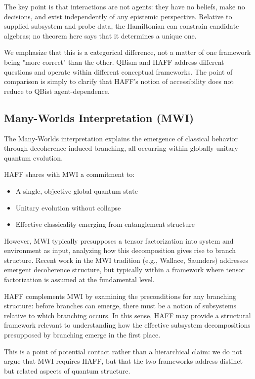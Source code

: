 \documentclass[12pt,a4paper,openany]{book}
\begin{document}
The key point is that interactions are not agents: they have no beliefs, make no decisions, and exist independently of any epistemic perspective.  Relative to supplied subsystem and probe data, the Hamiltonian can constrain candidate algebras; no theorem here says that it determines a unique one.

We emphasize that this is a categorical difference, not a matter of one framework being "more correct" than the other. QBism and HAFF address different questions and operate within different conceptual frameworks. The point of comparison is simply to clarify that HAFF's notion of accessibility does not reduce to QBist agent-dependence.

\subsection{Many-Worlds Interpretation (MWI)}

The Many-Worlds interpretation \cite{Wallace2012} explains the emergence of classical behavior through decoherence-induced branching, all occurring within globally unitary quantum evolution.

HAFF shares with MWI a commitment to:
\begin{itemize}
\item A single, objective global quantum state
\item Unitary evolution without collapse
\item Effective classicality emerging from entanglement structure
\end{itemize}

However, MWI typically presupposes a tensor factorization into system and environment as input, analyzing how this decomposition gives rise to branch structure. Recent work in the MWI tradition (e.g., Wallace, Saunders) addresses emergent decoherence structure, but typically within a framework where tensor factorization is assumed at the fundamental level.

HAFF complements MWI by examining the preconditions for any branching structure: before branches can emerge, there must be a notion of subsystems relative to which branching occurs. In this sense, HAFF may provide a structural framework relevant to understanding how the effective subsystem decompositions presupposed by branching emerge in the first place.

This is a point of potential contact rather than a hierarchical claim: we do not argue that MWI requires HAFF, but that the two frameworks address distinct but related aspects of quantum structure.
\end{document}
